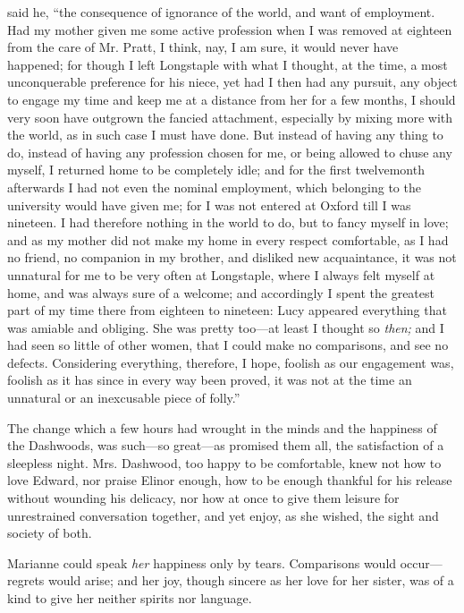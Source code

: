  said he, “the consequence of ignorance of the world, and want of employment. Had my mother given me some active profession when I was removed at eighteen from the care of Mr. Pratt, I think, nay, I am sure, it would never have happened; for though I left Longstaple with what I thought, at the time, a most unconquerable preference for his niece, yet had I then had any pursuit, any object to engage my time and keep me at a distance from her for a few months, I should very soon have outgrown the fancied attachment, especially by mixing more with the world, as in such case I must have done. But instead of having any thing to do, instead of having any profession chosen for me, or being allowed to chuse any myself, I returned home to be completely idle; and for the first twelvemonth afterwards I had not even the nominal employment, which belonging to the university would have given me; for I was not entered at Oxford till I was nineteen. I had therefore nothing in the world to do, but to fancy myself in love; and as my mother did not make my home in every respect comfortable, as I had no friend, no companion in my brother, and disliked new acquaintance, it was not unnatural for me to be very often at Longstaple, where I always felt myself at home, and was always sure of a welcome; and accordingly I spent the greatest part of my time there from eighteen to nineteen: Lucy appeared everything that was amiable and obliging. She was pretty too---at least I thought so {\em then;} and I had seen so little of other women, that I could make no comparisons, and see no defects. Considering everything, therefore, I hope, foolish as our engagement was, foolish as it has since in every way been proved, it was not at the time an unnatural or an inexcusable piece of folly.”

The change which a few hours had wrought in the minds and the happiness of the Dashwoods, was such---so great---as promised them all, the satisfaction of a sleepless night. Mrs. Dashwood, too happy to be comfortable, knew not how to love Edward, nor praise Elinor enough, how to be enough thankful for his release without wounding his delicacy, nor how at once to give them leisure for unrestrained conversation together, and yet enjoy, as she wished, the sight and society of both.

Marianne could speak {\em her} happiness only by tears. Comparisons would occur---regrets would arise; and her joy, though sincere as her love for her sister, was of a kind to give her neither spirits nor language.

